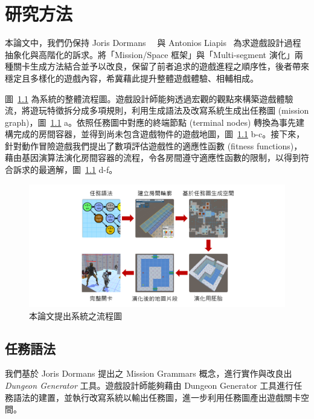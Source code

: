 \chapter{研究方法}
\label{cha:methodology}

本論文中，我們仍保持 Joris Dormans~\cite{dormans2010adventures}~\cite{dormans2012engineering} 與 Antonios Liapis~\cite{liapis2013generating} 為求遊戲設計過程抽象化與高階化的訴求。將「Mission/Space 框架」與「Multi-segment 演化」兩種關卡生成方法結合並予以改良，保留了前者追求的遊戲進程之順序性，後者帶來穩定且多樣化的遊戲內容，希冀藉此提升整體遊戲體驗、相輔相成。

圖~\ref{fig:system-framework} 為系統的整體流程圖。遊戲設計師能夠透過宏觀的觀點來構築遊戲體驗流，將遊玩特徵拆分成多項規則，利用生成語法及改寫系統生成出任務圖 (mission graph)，圖~\ref{fig:system-framework} a。依照任務圖中對應的終端節點 (terminal nodes) 轉換為事先建構完成的房間容器，並得到尚未包含遊戲物件的遊戲地圖，圖~\ref{fig:system-framework} b-c。接下來，針對動作冒險遊戲我們提出了數項評估遊戲性的適應性函數 (fitness functions)，藉由基因演算法演化房間容器的流程，令各房間遵守適應性函數的限制，以得到符合訴求的最適解，圖~\ref{fig:system-framework} d-f。

\begin{figure}[!htb]
  \begin{center}
    \includegraphics[width=1.0\textwidth]{figures/系統框架.png}
    \caption{本論文提出系統之流程圖} 
    \label{fig:system-framework}
  \end{center}
\end{figure}

\section{任務語法}
\label{sec:method-missiongrammars}

我們基於 Joris Dormans 提出之 Mission Grammars 概念，進行實作與改良出 \textit{Dungeon Generator} 工具。遊戲設計師能夠藉由 Dungeon Generator 工具進行任務語法的建置，並執行改寫系統以輸出任務圖，進一步利用任務圖產出遊戲關卡空間。

